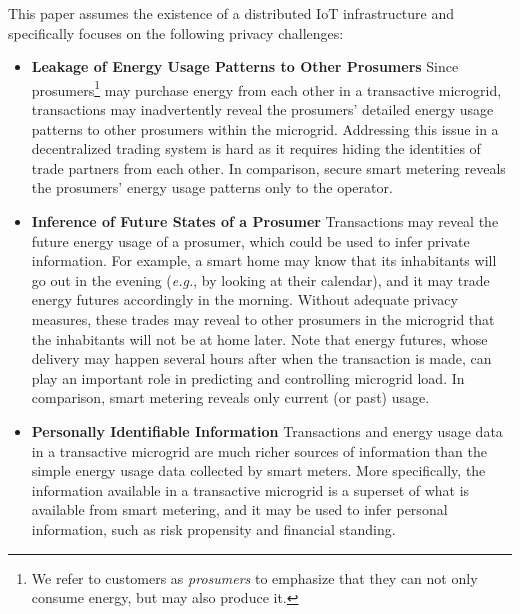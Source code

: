 This paper assumes the existence of a distributed IoT infrastructure
and specifically focuses on the following privacy challenges:
\begin{itemize}[itemsep=0.25\parskip,topsep=-0.5\parskip]
\item \textbf{Leakage of Energy Usage Patterns to Other Prosumers} 
 Since prosumers\footnote{We
  refer to customers as \emph{prosumers} to emphasize that they can
  not only consume energy, but may also produce it.} may purchase
  energy from each other in a transactive microgrid, transactions may
  inadvertently reveal the prosumers' detailed energy usage patterns
  to other prosumers within the microgrid.  Addressing this issue in a
  decentralized trading system is hard as it requires hiding the
  identities of trade partners from each other. In comparison, secure
  smart metering reveals the prosumers' energy usage patterns only to
  the operator.

\item \textbf{Inference of Future States of a Prosumer} 
   Transactions may reveal
  the future energy usage of a prosumer, which could be used to infer
  private information.  For example, a smart home may know that its
  inhabitants will go out in the evening (\emph{e.g.}, by looking at
  their calendar), and it may trade energy futures accordingly in the
  morning.  Without adequate privacy measures, these trades may reveal
  to other prosumers in the microgrid that the inhabitants will not be
  at home later.  Note that energy
  futures, whose delivery may happen several hours after when the
  transaction is made, can play an important role in predicting and
  controlling microgrid load.  In comparison, smart metering reveals
  only current (or past) usage.

\item \textbf{Personally Identifiable Information} 
  Transactions and energy
  usage data in a transactive microgrid are much richer sources of
  information than the simple energy usage data collected by smart
  meters.  More specifically, the information available in a
  transactive microgrid is a superset of what is available from smart
  metering, and it may be used to infer personal information, such as
  risk propensity and financial standing.
\end{itemize}
\vspace{0.5\parskip}

